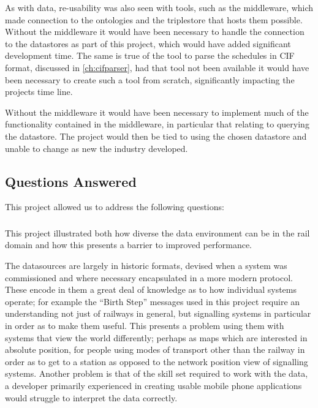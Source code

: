 As with data, re-usability was also seen with tools, such as the middleware, which made connection to the ontologies and the triplestore that hosts them possible. Without the middleware it would have been necessary to handle the connection to the datastores as part of this project, which would have added significant development time. The same is true of the tool to parse the schedules in CIF format, discussed in \autoref{ch:cifparser}, had that tool not been available it would have been necessary to create such a tool from scratch, significantly impacting the projects time line.  

Without the middleware it would have been necessary to implement much of the functionality contained in the middleware, in particular that relating to querying the datastore. The project would then be tied to using the chosen datastore and unable to change as new the industry developed.

\subsection{Questions Answered}

This project allowed us to address the following questions:
\begin{samepage}
\subsubsection*{\textit{\QuestionOtherData}} 
This project illustrated both how diverse the data environment can be in the rail domain and how this presents a barrier to improved performance. \end{samepage}The datasources are largely in historic formats, devised when a system was commissioned and where necessary encapsulated in a more modern protocol. These encode in them a great deal of knowledge as to how individual systems operate; for example the ``Birth Step'' messages used in this project require an understanding not just of railways in general, but signalling systems in particular in order as to make them useful. This presents a problem using them with systems that view the world differently; perhaps as maps which are interested in absolute position, for people using modes of transport other than the railway in order as to get to a station as opposed to the network position view of signalling systems. Another problem is that of the skill set required to work with the data, a developer primarily experienced in creating usable mobile phone applications would struggle to interpret the data correctly.

